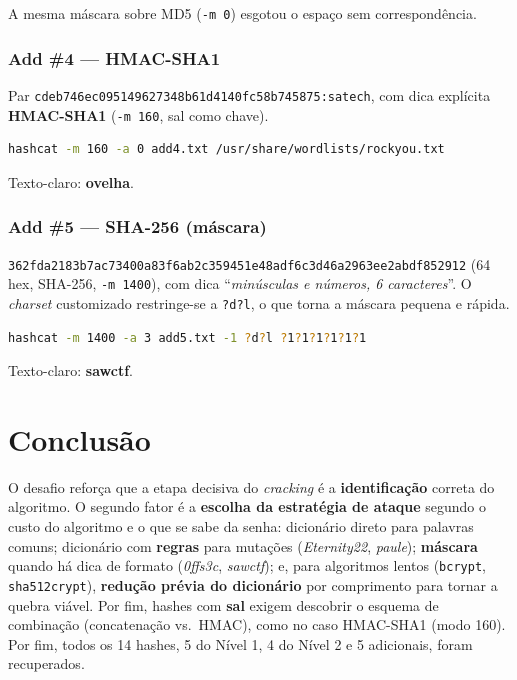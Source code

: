 \documentclass[12pt,a4paper]{article}
\newcommand{\cmd}[1]{\lstinline[style=shell]|#1|}
\begin{document}
\begin{becosemsaida}
A mesma máscara sobre MD5 (\cmd{-m 0}) esgotou o espaço sem correspondência.
\end{becosemsaida}

\subsubsection{Add \#4 --- HMAC-SHA1}
Par \cmd{cdeb746ec095149627348b61d4140fc58b745875:satech}, com dica explícita
\textbf{HMAC-SHA1} (\cmd{-m 160}, sal como chave).
\begin{lstlisting}[language=bash]
hashcat -m 160 -a 0 add4.txt /usr/share/wordlists/rockyou.txt
\end{lstlisting}
\noindent Texto-claro: \textbf{ovelha}.

\subsubsection{Add \#5 --- SHA-256 (máscara)}
\cmd{362fda2183b7ac73400a83f6ab2c359451e48adf6c3d46a2963ee2abdf852912} (64 hex,
SHA-256, \cmd{-m 1400}), com dica ``\emph{minúsculas e números, 6 caracteres}''.
O \emph{charset} customizado restringe-se a \cmd{?d?l}, o que torna a máscara
pequena e rápida.
\begin{lstlisting}[language=bash,caption={Máscara restrita a minúsculas e dígitos sobre SHA-256.}]
hashcat -m 1400 -a 3 add5.txt -1 ?d?l ?1?1?1?1?1?1
\end{lstlisting}
\noindent Texto-claro: \textbf{sawctf}.

\section{Conclusão}
O desafio reforça que a etapa decisiva do \emph{cracking} é a
\textbf{identificação} correta do algoritmo. O segundo fator é a \textbf{escolha da estratégia de ataque}
segundo o custo do algoritmo e o que se sabe da senha: dicionário direto para
palavras comuns; dicionário com \textbf{regras} para mutações
(\emph{Eternity22}, \emph{paule}); \textbf{máscara} quando há dica de formato
(\emph{0ffs3c}, \emph{sawctf}); e, para algoritmos lentos (\texttt{bcrypt},
\texttt{sha512crypt}), \textbf{redução prévia do dicionário} por comprimento para
tornar a quebra viável. Por fim, hashes com \textbf{sal} exigem descobrir o
esquema de combinação (concatenação vs.\ HMAC), como no caso HMAC-SHA1 (modo
160). Por fim, todos os 14 hashes, 5 do Nível 1, 4 do Nível 2 e 5 adicionais, foram
recuperados.
\end{document}
